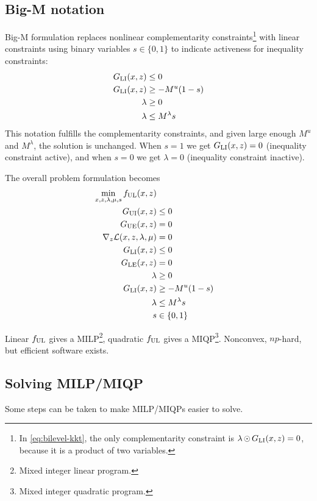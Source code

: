 \subsection{Big-M notation}
Big-M formulation replaces nonlinear complementarity constraints\footnote{In \eqref{eq:bilevel-kkt}, the only complementarity constraint is $\lambda \operatorname{\odot} G_\mathrm{LI}(x,z) = 0$, because it is a product of two variables.} with linear constraints using binary variables $s \in \{0,1\}$ to indicate activeness for inequality constraints:
%
\begin{equation}\label{eq:big-M}
  \begin{split}
    G_\mathrm{LI}(x,z) &\leq 0 \\
    G_\mathrm{LI}(x,z) &\geq -M^u(1-s) \\
    \lambda        &\geq 0 \\
    \lambda        &\leq M^\lambda s
  \end{split}
\end{equation}
%
This notation fulfills the complementarity constraints, and given large enough $M^u$ and $M^\lambda$, the solution is unchanged. When $s = 1$ we get $G_\mathrm{LI}(x,z) = 0$ (inequality constraint active), and when $s = 0$ we get $\lambda = 0$ (inequality constraint inactive).

The overall problem formulation becomes
%
\begin{equation}
  \begin{split}
    \min_{x,z,\lambda,\mu,s} f_\mathrm{UL}(x,z) \\
    G_\mathrm{UI}(x,z) & \leq 0 \\
    G_\mathrm{UE}(x,z) &= 0 \\
    \nabla_z \mathcal{L}(x,z,\lambda,\mu) &= 0 \\
    G_\mathrm{LI}(x,z) &\leq 0 \\
    G_\mathrm{LE}(x,z) &= 0 \\
    \lambda &\geq 0 \\
    G_\mathrm{LI}(x,z) &\geq -M^u(1-s) \\
    \lambda &\leq M^\lambda s \\
    s &\in \{0,1\}
  \end{split}
\end{equation}

Linear $f_\mathrm{UL}$ gives a MILP\footnote{Mixed integer linear program.}, quadratic $f_\mathrm{UL}$ gives a MIQP\footnote{Mixed integer quadratic program.}. Nonconvex, $np$-hard, but efficient software exists.

\subsection{Solving MILP/MIQP}
Some steps can be taken to make MILP/MIQPs easier to solve.

